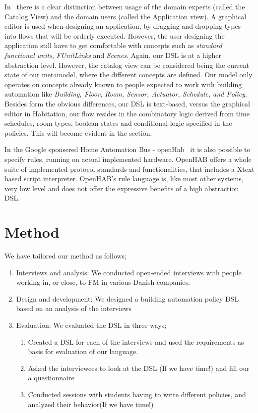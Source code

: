 \documentclass{llncs}
\begin{document}
In~\cite{habitation} there is a clear distinction between usage of the domain experts (called the Catalog View) and the domain users (called the Application view). A graphical editor is used when designing an application, by dragging and dropping types into flows that will be orderly executed. However, the user designing the application still have to get comfortable with concepts such as \textit{standard functional units}, \textit{FUnitLinks} and \textit{Scenes}. Again, our DSL is at a higher abstraction level. However, the catalog view can be considered being the current state of our metamodel, where the different concepts are defined. Our model only operates on concepts already known to people expected to work with building automation like \textit{Building, Floor, Room, Sensor, Actuator, Schedule, and Policy}. Besides form the obvious differences, our DSL is text-based, versus the graphical editor in Habitation, our flow resides in the combinatory logic derived from time schedules, room types, boolean states and conditional logic specified in the policies. This will become evident in the  section.

In the Google sponsered Home Automation Bus - openHab~\cite{openhab} it is also possible to specify rules, running on actual implemented hardware. OpenHAB offers a whole suite of implemented protocol standards and functionalities, that includes a Xtext based script interpreter. OpenHAB's rule language is, like most other systems, very low level and does not offer the expressive benefits of a high abstraction DSL.

\section{Method}\label{sec:method}
We have tailored our method as follows;

\begin{enumerate}
	\item Interviews and analysis: We conducted open-ended interviews with people working in, or close, to FM in various Danish companies.
	\item Design and development: We designed a building automation policy DSL based on an analysis of the interviews
	\item Evaluation: We evaluated the DSL in three ways;
	\begin{enumerate}
		\item Created a DSL for each of the interviews and used the requirements as basis for evaluation of our language.
		\item Asked the interviewees to look at the DSL (If we have time!) and fill our a questionnaire
		\item Conducted sessions with students having to write different policies, and analyzed their behavior(If we have time!)
	\end{enumerate}
\end{enumerate}
\end{document}
